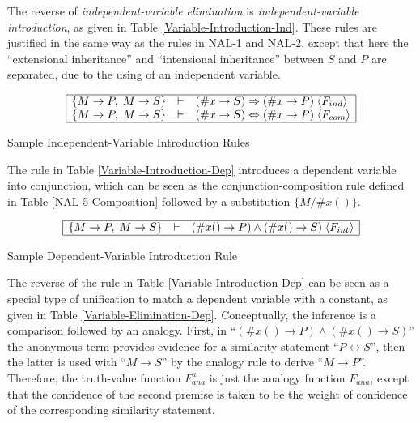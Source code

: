 The reverse of \emph{independent-variable elimination} is \emph{independent-variable introduction}, as given in Table \ref{Variable-Introduction-Ind}. These rules are justified in the same way as the rules in NAL-1 and NAL-2, except that here the ``extensional inheritance'' and ``intensional inheritance'' between $S$ and $P$ are separated, due to the using of an independent variable. 

\begin{table}[htb]
\[\begin{array}{|rcl|}
\hline
\{M \rightarrow P , \; M \rightarrow S \} & \vdash & (\#x \rightarrow S) \Rightarrow (\#x \rightarrow P) \; \langle F_{ind}\rangle  \\
\{M \rightarrow P , \; M \rightarrow S \} & \vdash & (\#x \rightarrow S) \Leftrightarrow (\#x \rightarrow P) \; \langle F_{com}\rangle  \\
\hline
\end{array}\]
\caption{Sample Independent-Variable Introduction Rules}
\label{Variable-Introduction-Ind}
\end{table}

The rule in Table \ref{Variable-Introduction-Dep} introduces a dependent variable into conjunction, which can be seen as the conjunction-composition rule defined in Table \ref{NAL-5-Composition} followed by a substitution $\{M/\#x()\}$. 

\begin{table}[htb]
\[\begin{array}{|rcl|}
\hline
\{M \rightarrow P , \; M \rightarrow S \} & \vdash & (\#x() \rightarrow P) \wedge (\#x() \rightarrow S) \; \langle F_{int}\rangle \\
\hline
\end{array}\]
\caption{Sample Dependent-Variable Introduction Rule}
\label{Variable-Introduction-Dep}
\end{table}

The reverse of the rule in Table \ref{Variable-Introduction-Dep} can be seen as a special type of unification to match a dependent variable with a constant, as given in Table \ref{Variable-Elimination-Dep}. Conceptually, the inference is a comparison followed by an analogy. First, in ``\((\#x() \rightarrow P) \wedge (\#x() \rightarrow S)\)'' the anonymous term provides evidence for a similarity statement ``\(P \leftrightarrow S\)'', then the latter is used with ``\(M \rightarrow S\)'' by the analogy rule to derive ``\(M \rightarrow P\)''. Therefore, the truth-value function $F^w_{ana}$ is just the analogy function $F_{ana}$, except that the confidence of the second premise is taken to be the weight of confidence of the corresponding similarity statement.

